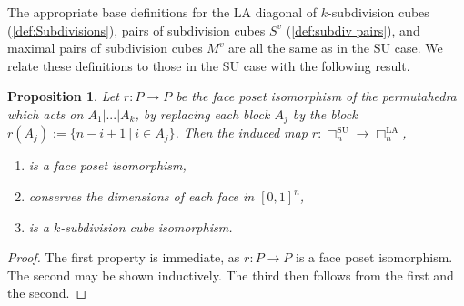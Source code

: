 \documentclass{amsart}
\newtheorem{proposition}[theorem]{Proposition}
\theoremstyle{definition}
\newcommand{\SU}{\mathrm{SU}}
\newcommand{\LA}{\mathrm{LA}}
\newcommand{\divcube}[1]{\Box_{#1}}
\newcommand{\subdivpairsv}{S^v}
\newcommand{\maxsubdivpairsv}{M^v}
\begin{document}
The appropriate base definitions for the $\LA$ diagonal of $k$-subdivision cubes (\ref{def:Subdivisions}),  pairs of subdivision cubes ${\subdivpairsv}$ (\ref{def:subdiv pairs}), and maximal pairs of subdivision cubes $\maxsubdivpairsv$ are all the same as in the $\SU$ case.
We relate these definitions to those in the $\SU$ case with the following result.
\begin{proposition}\label{prop:r is a k-subdiv cube isomorphism}
Let $r:P\to P$ be the face poset isomorphism of the permutahedra which acts on $A_1|...|A_k$, by replacing each block $A_j$ by the block $r(A_j):=\{n-i+1 \ | \ i \in A_j\}$.
Then the induced map $r:\divcube{n}^{\SU}\to \divcube{n}^{\LA}$,
\begin{enumerate}
	\item is a face poset isomorphism,
	\item conserves the dimensions of each face in $[0,1]^{n}$,
	\item is a $k$-subdivision cube isomorphism.
\end{enumerate}
\end{proposition}
\begin{proof}
The first property is immediate, as $r:P\to P$ is a face poset isomorphism.
The second may be shown inductively.
The third then follows from the first and the second.
\end{proof}
\end{document}
